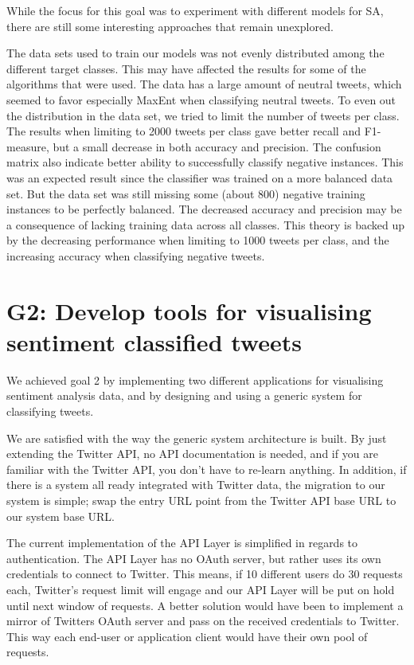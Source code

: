 While the focus for this goal was to experiment with different models for SA, there are still some interesting approaches that remain unexplored. 

The data sets used to train our models was not evenly distributed among the different target classes. This may have affected the results for some of the algorithms that were used. The data has a large amount of neutral tweets, which seemed to favor especially MaxEnt when classifying neutral tweets. To even out the distribution in the data set, we tried to limit the number of tweets per class. The results when limiting to 2000 tweets per class gave better recall and F1-measure, but a small decrease in both accuracy and precision. The confusion matrix also indicate better ability to successfully classify negative instances. This was an expected result since the classifier was trained on a more balanced data set. But the data set was still missing some (about 800) negative training instances to be perfectly balanced. The decreased accuracy and precision may be a consequence of lacking training data across all classes. This theory is backed up by the decreasing performance when limiting to 1000 tweets per class, and the increasing accuracy when classifying negative tweets. 


\section{G2: Develop tools for visualising sentiment classified tweets}

We achieved goal 2 by implementing two different applications for visualising sentiment analysis data, and by designing and using a generic system for classifying tweets. 

We are satisfied with the way the generic system architecture is built. By just extending the Twitter API, no API documentation is needed, and if you are familiar with the Twitter API, you don't have to re-learn anything. In addition, if there is a system all ready integrated with Twitter data, the migration to our system is simple; swap the entry URL point from the Twitter API base URL to our system base URL. 

The current implementation of the API Layer is simplified in regards to authentication. The API Layer has no OAuth server, but rather uses its own credentials to connect to Twitter. This means, if 10 different users do 30 requests each, Twitter's request limit will engage and our API Layer will be put on hold until next window of requests. A better solution would have been to implement a mirror of Twitters OAuth server and pass on the received credentials to Twitter. This way each end-user or application client would have their own pool of requests. 

